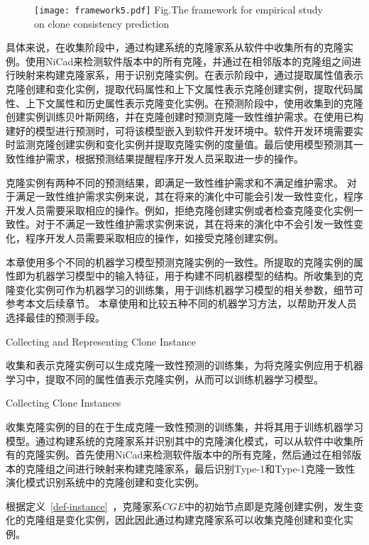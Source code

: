 \begin{figure}[htbp]
\centering
\texttt{[image: framework5.pdf]}
{Fig.$\!$}{The framework for empirical study on clone consistency prediction }
\vspace{-1em}
\end{figure}

具体来说，在收集阶段中，通过构建系统的克隆家系从软件中收集所有的克隆实例。使用NiCad来检测软件版本中的所有克隆，并通过在相邻版本的克隆组之间进行映射来构建克隆家系，用于识别克隆实例。在表示阶段中，通过提取属性值表示克隆创建和变化实例，提取代码属性和上下文属性表示克隆创建实例，提取代码属性、上下文属性和历史属性表示克隆变化实例。在预测阶段中，使用收集到的克隆创建实例训练贝叶斯网络，并在克隆创建时预测克隆一致性维护需求。在使用已构建好的模型进行预测时，可将该模型嵌入到软件开发环境中。软件开发环境需要实时监测克隆创建实例和变化实例并提取克隆实例的度量值。最后使用模型预测其一致性维护需求，根据预测结果提醒程序开发人员采取进一步的操作。

克隆实例有两种不同的预测结果，即满足一致性维护需求和不满足维护需求。
对于满足一致性维护需求实例来说，其在将来的演化中可能会引发一致性变化，程序开发人员需要采取相应的操作。例如，拒绝克隆创建实例或者检查克隆变化实例一致性。对于不满足一致性维护需求实例来说，其在将来的演化中不会引发一致性变化，程序开发人员需要采取相应的操作，如接受克隆创建实例。

本章使用多个不同的机器学习模型预测克隆实例的一致性。所提取的克隆实例的属性即为机器学习模型中的输入特征，用于构建不同机器模型的结构。所收集到的克隆变化实例可作为机器学习的训练集，用于训练机器学习模型的相关参数，细节可参考本文后续章节。
本章使用和比较五种不同的机器学习方法，以帮助开发人员选择最佳的预测手段。

{Collecting and Representing Clone Instance}

收集和表示克隆实例可以生成克隆一致性预测的训练集，为将克隆实例应用于机器学习中，提取不同的属性值表示克隆实例，从而可以训练机器学习模型。

{Collecting Clone Instances}

收集克隆实例的目的在于生成克隆一致性预测的训练集，并将其用于训练机器学习模型。通过构建系统的克隆家系并识别其中的克隆演化模式，可以从软件中收集所有的克隆实例。首先使用NiCad来检测软件版本中的所有克隆，然后通过在相邻版本的克隆组之间进行映射来构建克隆家系，最后识别Type-1和Type-1克隆一致性演化模式识别系统中的克隆创建和变化实例。

根据定义~\ref{def-instance}~，克隆家系$CGE$中的初始节点即是克隆创建实例，发生变化的克隆组是变化实例，因此因此通过构建克隆家系可以收集克隆创建和变化实例。

